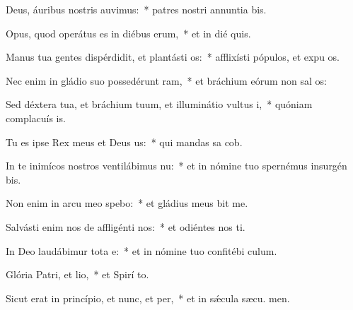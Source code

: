 \item Deus, áuribus nostris auvimus:~* patres nostri annuntia bis.
\item Opus, quod operátus es in diébus erum,~* et in dié quis.
\item Manus tua gentes dispérdidit, et plantásti os:~* afflixísti pópulos, et expu os.
\item Nec enim in gládio suo possedérunt ram,~* et bráchium eórum non sal os:
\item Sed déxtera tua, et bráchium tuum, et illuminátio vultus i,~* quóniam complacuís  is.
\item Tu es ipse Rex meus et Deus us:~* qui mandas sa cob.
\item In te inimícos nostros ventilábimus nu:~* et in nómine tuo spernémus insurgén  bis.
\item Non enim in arcu meo spebo:~* et gládius meus  bit me.
\item Salvásti enim nos de affligénti nos:~* et odiéntes nos ti.
\item In Deo laudábimur tota e:~* et in nómine tuo confitébi  culum.
\item Glória Patri, et lio,~* et Spirí to.
\item Sicut erat in princípio, et nunc, et per,~* et in sǽcula sæcu. men.
